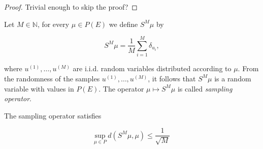 \begin{proof} Trivial enough to skip the proof?
\end{proof}

\begin{definition}
  Let $M \in \mathbb{N}$, for every $\mu \in P(E)$ we define $S^M\mu$ by

  \begin{equation*}
    S^M\mu = \frac1{M}\sum_{i=1}^M\delta_{u_i},
  \end{equation*}

  where $u^{(1)}, \ldots, u^{(M)}$ are i.i.d. random variables distributed according to $\mu$. From the randomness of the samples $u^{(1)}, \ldots, u^{(M)}$, it follows that $S^M\mu$ is a random variable with values in $P(E)$. The operator $\mu \mapsto S^M\mu$ is called \textit{sampling operator}.
\end{definition}

\begin{lemma}\label{sampling-bound}
  The sampling operator satisfies

  \begin{equation*}
    \underset{\mu \in P}{\text{sup}}\ d(S^M\mu, \mu) \le \frac1{\sqrt{M}}
  \end{equation*}
\end{lemma}

